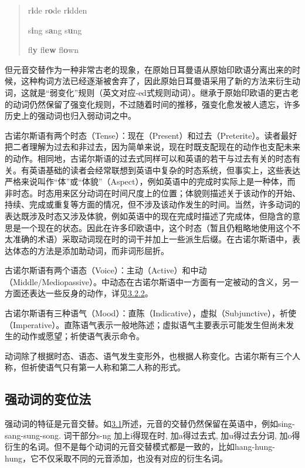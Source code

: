 \begin{quote}
r\textbf{i}de r\textbf{o}de r\textbf{i}dden

s\textbf{i}ng s\textbf{a}ng s\textbf{u}ng

fl\textbf{y} fl\textbf{ew} fl\textbf{o}wn
\end{quote}

但元音交替作为一种非常古老的现象，在原始日耳曼语从原始印欧语分离出来的时候，这种构词方法已经逐渐被舍弃了，因此原始日耳曼语采用了新的方法来衍生动词，这就是``弱变化''规则（英文对应-ed式规则动词）。继承于原始印欧语的更古老的动词仍然保留了强变化规则，不过随着时间的推移，强变化愈发被人遗忘，许多历史上的强动词也归入弱动词之中。

古诺尔斯语有两个时态（Tense）：现在（Present）和过去（Preterite）。读者最好把二者理解为过去和非过去，因为简单来说，现在时既支配现在的动作也支配未来的动作。相同地，古诺尔斯语的过去式同样可以和英语的若干与过去有关的时态有关。有英语基础的读者会经常联想到英语中复杂的时态系统，但事实上，这些表达严格来说叫作``体''或``体貌''（Aspect），例如英语中的完成时实际上是一种体，而非时态。时态用来区分动词在时间尺度上的位置；体貌则描述关于该动作的开始、持续、完成或重复等方面的情况，但不涉及该动作发生的时间。当然，许多动词的表达既涉及时态又涉及体貌，例如英语中的现在完成时描述了完成体，但隐含的意思是一个现在的状态。因此在许多印欧语中，这个时态（暂且仍粗略地使用这个不太准确的术语）采取动词现在时的词干并加上一些派生后缀。在古诺尔斯语中，表达体态的方法是添加助动词，而非词形屈折。

古诺尔斯语有两个语态（Voice）：主动（Active）和中动（Middle/Mediopassive）。中动态在古诺尔斯语中一方面有一定被动的含义，另一方面还表达一些反身的动作，详见\hyperref[ux5f3aux52a8ux8bcdux7684ux4e2dux52a8ux8bcdux5c3e]{3.2.2}。

古诺尔斯语有三种语气（Mood）：直陈（Indicative），虚拟（Subjunctive），祈使（Imperative）。直陈语气表示一般地陈述；虚拟语气主要表示可能发生但尚未发生的动作或愿望；祈使语气表示命令。

动词除了根据时态、语态、语气发生变形外，也根据人称变化。古诺尔斯有三个人称，但祈使语气只有第一人称和第二人称的形式。

\subsection{强动词的变位法}\label{ux5f3aux52a8ux8bcdux7684ux53d8ux4f4dux6cd5}

强动词的特征是元音交替。如\hyperref[ux52a8ux8bcdux7684ux6982ux8ff0]{3.1}所述，元音的交替仍然保留在英语中，例如sing-sang-sung-song.
词干部分s-ng 加上i得现在时, 加a得过去式, 加u得过去分词,
加o得衍生的名词。但不是每个动词的元音交替模式都是一致的，比如hang-hung-hung，它不仅采取不同的元音添加，也没有对应的衍生名词。

